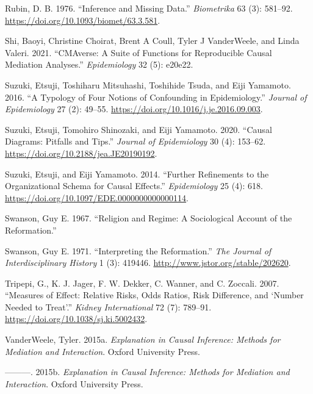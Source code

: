 \documentclass[
  singlecolumn]{report}
\newlength{\cslhangindent}
\newlength{\cslentryspacingunit} %
\newenvironment{CSLReferences}[2] %
 {%
  \setlength{\parindent}{0pt}
  \ifodd #1
  \let\oldpar\par
  \def\par{\hangindent=\cslhangindent\oldpar}
  \fi
  \setlength{\parskip}{#2\cslentryspacingunit}
 }%
 {}
\begin{document}
\begin{CSLReferences}{1}{0}
\leavevmode{}%
Rubin, D. B. 1976. {``Inference and Missing Data.''} \emph{Biometrika}
63 (3): 581--92. \url{https://doi.org/10.1093/biomet/63.3.581}.

\leavevmode{}%
Shi, Baoyi, Christine Choirat, Brent A Coull, Tyler J VanderWeele, and
Linda Valeri. 2021. {``CMAverse: A Suite of Functions for Reproducible
Causal Mediation Analyses.''} \emph{Epidemiology} 32 (5): e20e22.

\leavevmode{}%
Suzuki, Etsuji, Toshiharu Mitsuhashi, Toshihide Tsuda, and Eiji
Yamamoto. 2016. {``A Typology of Four Notions of Confounding in
Epidemiology.''} \emph{Journal of Epidemiology} 27 (2): 49--55.
\url{https://doi.org/10.1016/j.je.2016.09.003}.

\leavevmode{}%
Suzuki, Etsuji, Tomohiro Shinozaki, and Eiji Yamamoto. 2020. {``Causal
Diagrams: Pitfalls and Tips.''} \emph{Journal of Epidemiology} 30 (4):
153--62. \url{https://doi.org/10.2188/jea.JE20190192}.

\leavevmode{}%
Suzuki, Etsuji, and Eiji Yamamoto. 2014. {``Further Refinements to the
Organizational Schema for Causal Effects.''} \emph{Epidemiology} 25 (4):
618. \url{https://doi.org/10.1097/EDE.0000000000000114}.

\leavevmode{}%
Swanson, Guy E. 1967. {``Religion and Regime: A Sociological Account of
the Reformation.''}

\leavevmode{}%
Swanson, Guy E. 1971. {``Interpreting the Reformation.''} \emph{The
Journal of Interdisciplinary History} 1 (3): 419446.
\url{http://www.jstor.org/stable/202620}.

\leavevmode{}%
Tripepi, G., K. J. Jager, F. W. Dekker, C. Wanner, and C. Zoccali. 2007.
{``Measures of Effect: Relative Risks, Odds Ratios, Risk Difference, and
{`}Number Needed to Treat{'}.''} \emph{Kidney International} 72 (7):
789--91. \url{https://doi.org/10.1038/sj.ki.5002432}.

\leavevmode{}%
VanderWeele, Tyler. 2015a. \emph{Explanation in Causal Inference:
Methods for Mediation and Interaction}. Oxford University Press.

\leavevmode{}%
---------. 2015b. \emph{Explanation in Causal Inference: Methods for
Mediation and Interaction}. Oxford University Press.


\end{CSLReferences}
\end{document}
